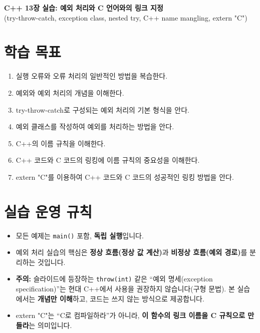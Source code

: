 \documentclass[11pt,a4paper]{article}
\begin{document}
\begin{center}
  {\LARGE \textbf{C++ 13장 실습: 예외 처리와 C 언어와의 링크 지정}}\\
  \vspace{6pt}
  {\large (try-throw-catch, exception class, nested try, C++ name mangling, extern "C")}
\end{center}

\vspace{8pt}

\section*{학습 목표}
\begin{GoalBox}
\begin{enumerate}[leftmargin=18pt]
  \item 실행 오류와 오류 처리의 일반적인 방법을 복습한다.
  \item 예외와 예외 처리의 개념을 이해한다.
  \item try-throw-catch로 구성되는 예외 처리의 기본 형식을 안다.
  \item 예외 클래스를 작성하여 예외를 처리하는 방법을 안다.
  \item C++의 이름 규칙을 이해한다.
  \item C++ 코드와 C 코드의 링킹에 이름 규칙의 중요성을 이해한다.
  \item extern "C"를 이용하여 C++ 코드와 C 코드의 성공적인 링킹 방법을 안다.
\end{enumerate}
\end{GoalBox}

\section*{실습 운영 규칙}
\begin{itemize}[leftmargin=18pt]
  \item 모든 예제는 \texttt{main()} 포함, \textbf{독립 실행}입니다.
  \item 예외 처리 실습의 핵심은 \textbf{정상 흐름(정상 값 계산)}과 \textbf{비정상 흐름(예외 경로)}를 분리하는 것입니다.
  \item \textbf{주의:} 슬라이드에 등장하는 \texttt{throw(int)} 같은 ``예외 명세(exception specification)''는 현대 C++에서 사용을 권장하지 않습니다(구형 문법). 본 실습에서는 \textbf{개념만 이해}하고, 코드는 쓰지 않는 방식으로 제공합니다.
  \item extern "C"는 ``C로 컴파일하라''가 아니라, \textbf{이 함수의 링크 이름을 C 규칙으로 만들라}는 의미입니다.
\end{itemize}
\end{document}
